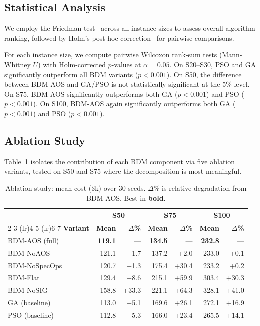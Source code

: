 \subsection{Statistical Analysis}
\label{sec:stats}

We employ the Friedman test~\citep{garcia2009} across all instance sizes to assess overall algorithm ranking, followed by Holm's post-hoc correction~\citep{holm1979} for pairwise comparisons.

For each instance size, we compute pairwise Wilcoxon rank-sum tests (Mann-Whitney $U$) with Holm-corrected $p$-values at $\alpha{=}0.05$.
On S20--S30, PSO and GA significantly outperform all BDM variants ($p < 0.001$).
On S50, the difference between BDM-AOS and GA/PSO is not statistically significant at the 5\% level.
On S75, BDM-AOS significantly outperforms both GA ($p < 0.001$) and PSO ($p < 0.001$).
On S100, BDM-AOS again significantly outperforms both GA ($p < 0.001$) and PSO ($p < 0.001$).

\subsection{Ablation Study}
\label{sec:ablation}

Table~\ref{tab:ablation} isolates the contribution of each BDM component via five ablation variants, tested on S50 and S75 where the decomposition is most meaningful.

\begin{table}[h]
\centering
\caption{Ablation study: mean cost (\$k) over 30 seeds. $\Delta$\% is relative degradation from BDM-AOS. Best in \textbf{bold}.}
\label{tab:ablation}
\small
\begin{tabular}{l rr rr rr}
\toprule
 & \multicolumn{2}{c}{\textbf{S50}} & \multicolumn{2}{c}{\textbf{S75}} & \multicolumn{2}{c}{\textbf{S100}} \\
\cmidrule(lr){2-3} \cmidrule(lr){4-5} \cmidrule(lr){6-7}
\textbf{Variant} & \textbf{Mean} & \textbf{$\Delta$\%} & \textbf{Mean} & \textbf{$\Delta$\%} & \textbf{Mean} & \textbf{$\Delta$\%} \\
\midrule
BDM-AOS (full)     & \textbf{119.1} & ---    & \textbf{134.5} & ---    & \textbf{232.8} & ---    \\
BDM-NoAOS          & 121.1          & +1.7   & 137.2          & +2.0   & 233.0          & +0.1   \\
BDM-NoSpecOps      & 120.7          & +1.3   & 175.4          & +30.4  & 233.2          & +0.2   \\
BDM-Flat           & 129.4          & +8.6   & 215.1          & +59.9  & 303.4          & +30.3  \\
BDM-NoSIG          & 158.8          & +33.3  & 221.1          & +64.3  & 328.1          & +41.0  \\
\midrule
GA (baseline)      & 113.0          & $-$5.1 & 169.6          & +26.1  & 272.1          & +16.9  \\
PSO (baseline)     & 112.8          & $-$5.3 & 166.0          & +23.4  & 265.5          & +14.1  \\
\bottomrule
\end{tabular}
\end{table}

